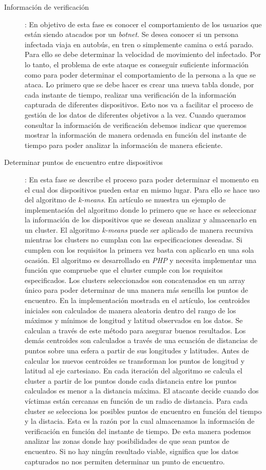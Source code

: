 \documentclass[a4paper,11pt]{report}
\begin{document}
\begin{description}
\item [Información de verificación]: En objetivo de esta fase es conocer el comportamiento de los usuarios que están siendo atacados por un \emph{botnet}. Se desea conocer si un persona infectada viaja en autobús, en tren o simplemente camina o está parado. Para ello se debe determinar la velocidad de movimiento del infectado. Por lo tanto, el problema de este ataque es conseguir suficiente información como para poder determinar el comportamiento de la persona a la que se ataca. Lo primero que se debe hacer es crear una nueva tabla donde, por cada instante de tiempo, realizar una verificación de la información capturada de diferentes dispositivos. Esto nos va a facilitar el proceso de gestión de los datos de diferentes objetivos a la vez. Cuando queramos consultar la información de verificación debemos indicar que queremos mostrar la información de manera ordenada en función del instante de tiempo para poder analizar la información de manera eficiente.

\item [Determinar puntos de encuentro entre dispositivos]: En esta fase se describe el proceso para poder determinar el momento en el cual dos dispositivos pueden estar en mismo lugar. Para ello se hace uso del algoritmo de \emph{k-means}. En artículo se muestra un ejemplo de implementación del algoritmo donde lo primero que se hace es seleccionar la información de los dispositivos que se desean analizar y almacenarlo en un cluster. El algoritmo \emph{k-means} puede ser aplicado de manera recursiva mientras los clusters no cumplan con las especificaciones deseadas. Si cumplen con los requisitos la primera vez basta con aplicarlo en una sola ocasión. El algoritmo es desarrollado en \emph{PHP} y necesita implementar una función que compruebe que el cluster cumple con los requisitos especificados. Los clusters seleccionados son concatenados en un array único para poder determinar de una manera más sencilla los puntos de encuentro. En la implementación mostrada en el artículo, los centroides iniciales son calculados de manera aleatoria dentro del rango de los máximos y mínimos de longitud y latitud observados en los datos. Se calculan a través de este método para asegurar buenos resultados. Los demás centroides son calculados a través de una ecuación de distancias de puntos sobre una esfera a partir de sus longitudes y latitudes. Antes de calcular los nuevos centroides se transforman los puntos de longitud y latitud al eje cartesiano. En cada iteración del algoritmo se calcula el cluster a partir de los puntos donde cada distancia entre los puntos calculados es menor a la distancia máxima. El atacante decide cuando dos víctimas están cercanas en función de un radio de distancia. Para cada cluster se selecciona los posibles puntos de encuentro en función del tiempo y la distacia. Esta es la razón por la cual almacenamos la información de verificación en función del instante de tiempo. De esta manera podemos analizar las zonas donde hay posibilidades de que sean puntos de encuentro. Si no hay ningún resultado viable, significa que los datos capturados no nos permiten determinar un punto de encuentro.

\end{description}
\end{document}
